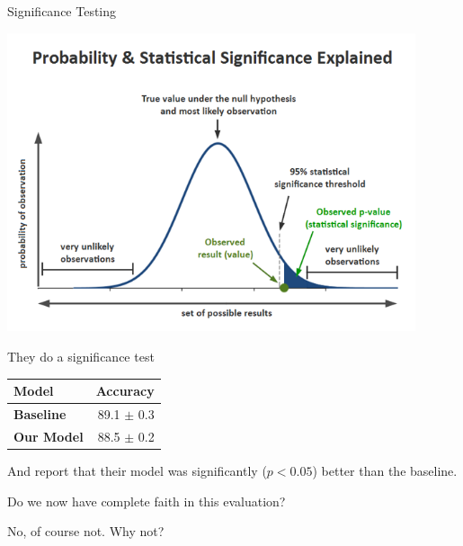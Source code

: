 \begin{vbframe}{Significance Testing}

	\includegraphics[width=0.9\textwidth]{evaluation_figures/significance_testing.png}

\end{vbframe}


\begin{vbframe}{They do a significance test}

	\vfill

	\begin{table}
		\centering
		\begin{tabular}{l|r}
			\textbf{Model} & \textbf{Accuracy} \\
			\hline
			\textbf{Baseline} & 89.1 $\pm$ 0.3 \\
			\textbf{Our Model} & 88.5 $\pm$ 0.2\\
		\end{tabular}
	\end{table}

	\vfill

	And report that their model was significantly ($p < 0.05$) better than the baseline.
	
\end{vbframe}

\begin{vbframe}{Do we now have complete faith in this evaluation?}

	\vfill
No, of course not.
\vfill
Why not?
\vfill
\end{vbframe}

